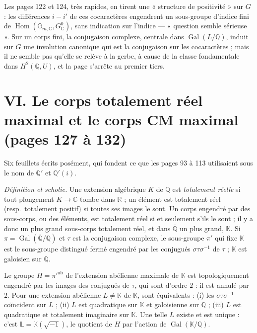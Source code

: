 \documentclass[11pt,a4paper]{article}
\begin{document}
Les pages 122 et 124, très rapides, en tirent une « structure de positivité »
sur $G$ : les différences $i - i'$ de ces cocaractères engendrent un sous-groupe
d'indice fini de $\operatorname{Hom}(\mathbb{G}_{m,\mathbb{C}},
G^{0}_{\mathbb{C}})$, sans indication sur l'indice --- « question semble
sérieuse ». Sur un corps fini, la conjugaison complexe, centrale dans
$\operatorname{Gal}(L/\mathbb{Q})$, induit sur $G$ une involution canonique qui
est la conjugaison sur les cocaractères ; mais il ne semble pas qu'elle se
relève à la gerbe, à cause de la classe fondamentale dans $H^{2}(\mathbb{Q},
U)$, et la page s'arrête au premier tiers.

\section*{VI. Le corps totalement réel maximal et le corps CM maximal (pages 127 à 132)}

Six feuillets écrits posément, qui fondent ce que les pages 93 à 113 utilisaient
sous le nom de $\mathbb{Q}'$ et $\mathbb{Q}'(i)$.

\emph{Définition et scholie.} Une extension algébrique $K$ de $\mathbb{Q}$ est
\emph{totalement réelle} si tout plongement $K \to \mathbb{C}$ tombe dans
$\mathbb{R}$ ; un élément est totalement réel (resp.\ totalement positif) si
toutes ses images le sont. Un corps engendré par des sous-corps, ou des éléments,
est totalement réel si et seulement s'ils le sont ; il y a donc un plus grand
sous-corps totalement réel, et dans $\overline{\mathbb{Q}}$ un plus grand,
$\mathbb{K}$. Si $\pi = \operatorname{Gal}(\overline{\mathbb{Q}}/\mathbb{Q})$ et
$\tau$ est la conjugaison complexe, le sous-groupe $\pi'$ qui fixe $\mathbb{K}$
est le sous-groupe distingué fermé engendré par les conjugués $\sigma\tau
\sigma^{-1}$ de $\tau$ ; $\mathbb{K}$ est galoisien sur $\mathbb{Q}$.

Le groupe $H = \pi'^{\mathrm{ab}}$ de l'extension abélienne maximale de
$\mathbb{K}$ est topologiquement engendré par les images des conjugués de $\tau$,
qui sont d'ordre $2$ : il est annulé par $2$. Pour une extension abélienne $L
\neq \mathbb{K}$ de $\mathbb{K}$, sont équivalents : (i) les $\sigma\tau
\sigma^{-1}$ coïncident sur $L$ ; (ii) $L$ est quadratique sur $\mathbb{K}$ et
galoisienne sur $\mathbb{Q}$ ; (iii) $L$ est quadratique et totalement
imaginaire sur $\mathbb{K}$. Une telle $L$ existe et est unique : c'est
$\mathbb{L} = \mathbb{K}(\sqrt{-1})$, le quotient de $H$ par l'action de
$\operatorname{Gal}(\mathbb{K}/\mathbb{Q})$.
\end{document}
